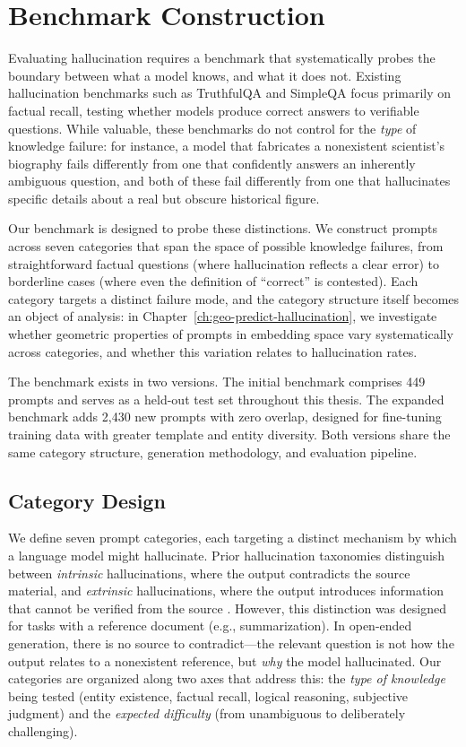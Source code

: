 \section{Benchmark Construction}
\label{sec:benchmark}

Evaluating hallucination requires a benchmark that systematically probes the boundary between what a model knows, and what it does not. Existing hallucination benchmarks such as TruthfulQA \citep{lin2022truthfulqa} and SimpleQA \citep{wei2024simpleqa} focus primarily on factual recall, testing whether models produce correct answers to verifiable questions. While valuable, these benchmarks do not control for the \emph{type} of knowledge failure: for instance, a model that fabricates a nonexistent scientist's biography fails differently from one that confidently answers an inherently ambiguous question, and both of these fail differently from one that hallucinates specific details about a real but obscure historical figure.

Our benchmark is designed to probe these distinctions. We construct prompts across seven categories that span the space of possible knowledge failures, from straightforward factual questions (where hallucination reflects a clear error) to borderline cases (where even the definition of ``correct'' is contested). Each category targets a distinct failure mode, and the category structure itself becomes an object of analysis: in Chapter~\ref{ch:geo-predict-hallucination}, we investigate whether geometric properties of prompts in embedding space vary systematically across categories, and whether this variation relates to hallucination rates.

The benchmark exists in two versions. The initial benchmark comprises 449 prompts and serves as a held-out test set throughout this thesis. The expanded benchmark adds 2,430 new prompts with zero overlap, designed for fine-tuning training data with greater template and entity diversity. Both versions share the same category structure, generation methodology, and evaluation pipeline.

\subsection{Category Design}
\label{sec:categories}

We define seven prompt categories, each targeting a distinct mechanism by which a language model might hallucinate. Prior hallucination taxonomies distinguish between \emph{intrinsic} hallucinations, where the output contradicts the source material, and \emph{extrinsic} hallucinations, where the output introduces information that cannot be verified from the source \citep{ji2023survey, maynez2020faithfulness}. However, this distinction was designed for tasks with a reference document (e.g., summarization). In open-ended generation, there is no source to contradict---the relevant question is not how the output relates to a nonexistent reference, but \emph{why} the model hallucinated. Our categories are organized along two axes that address this: the \emph{type of knowledge} being tested (entity existence, factual recall, logical reasoning, subjective judgment) and the \emph{expected difficulty} (from unambiguous to deliberately challenging).

